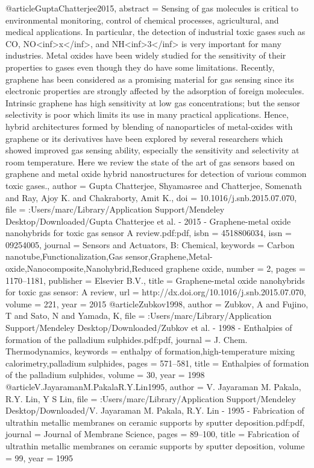 @article{GuptaChatterjee2015,
abstract = {Sensing of gas molecules is critical to environmental monitoring, control of chemical processes, agricultural, and medical applications. In particular, the detection of industrial toxic gases such as CO, NO{\textless}inf{\textgreater}x{\textless}/inf{\textgreater}, and NH{\textless}inf{\textgreater}3{\textless}/inf{\textgreater} is very important for many industries. Metal oxides have been widely studied for the sensitivity of their properties to gases even though they do have some limitations. Recently, graphene has been considered as a promising material for gas sensing since its electronic properties are strongly affected by the adsorption of foreign molecules. Intrinsic graphene has high sensitivity at low gas concentrations; but the sensor selectivity is poor which limits its use in many practical applications. Hence, hybrid architectures formed by blending of nanoparticles of metal-oxides with graphene or its derivatives have been explored by several researchers which showed improved gas sensing ability, especially the sensitivity and selectivity at room temperature. Here we review the state of the art of gas sensors based on graphene and metal oxide hybrid nanostructures for detection of various common toxic gases.},
author = {{Gupta Chatterjee}, Shyamasree and Chatterjee, Somenath and Ray, Ajoy K. and Chakraborty, Amit K.},
doi = {10.1016/j.snb.2015.07.070},
file = {:Users/marc/Library/Application Support/Mendeley Desktop/Downloaded/Gupta Chatterjee et al. - 2015 - Graphene-metal oxide nanohybrids for toxic gas sensor A review.pdf:pdf},
isbn = {4518806034},
issn = {09254005},
journal = {Sensors and Actuators, B: Chemical},
keywords = {Carbon nanotube,Functionalization,Gas sensor,Graphene,Metal-oxide,Nanocomposite,Nanohybrid,Reduced graphene oxide},
number = {2},
pages = {1170--1181},
publisher = {Elsevier B.V.},
title = {{Graphene-metal oxide nanohybrids for toxic gas sensor: A review}},
url = {http://dx.doi.org/10.1016/j.snb.2015.07.070},
volume = {221},
year = {2015}
}
@article{Zubkov1998,
author = {Zubkov, A and Fujino, T and Sato, N and Yamada, K},
file = {:Users/marc/Library/Application Support/Mendeley Desktop/Downloaded/Zubkov et al. - 1998 - Enthalpies of formation of the palladium sulphides.pdf:pdf},
journal = {J. Chem. Thermodynamics},
keywords = {enthalpy of formation,high-temperature mixing calorimetry,palladium sulphides},
pages = {571--581},
title = {{Enthalpies of formation of the palladium sulphides}},
volume = {30},
year = {1998}
}
@article{V.JayaramanM.PakalaR.Y.Lin1995,
author = {{V. Jayaraman M. Pakala, R.Y. Lin}, Y S Lin},
file = {:Users/marc/Library/Application Support/Mendeley Desktop/Downloaded/V. Jayaraman M. Pakala, R.Y. Lin - 1995 - Fabrication of ultrathin metallic membranes on ceramic supports by sputter deposition.pdf:pdf},
journal = {Journal of Membrane Science},
pages = {89--100},
title = {{Fabrication of ultrathin metallic membranes on ceramic supports by sputter deposition}},
volume = {99},
year = {1995}
}
